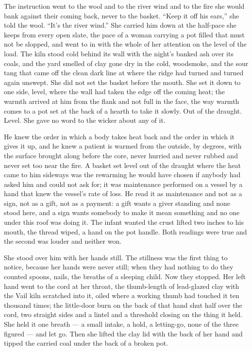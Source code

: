 The instruction went to the wool and to the river wind and to the fire she would bank against their coming back, never to the basket. “Keep it off his ears,” she told the wool. “It's the river wind.” She carried him down at the half-pace she keeps from every open slate, the pace of a woman carrying a pot filled that must not be slopped, and went to  in  with the whole of her attention on the level of the load. The kiln stood cold behind its wall with the night's banked ash over its coals, and the yard smelled of clay gone dry in the cold, woodsmoke, and the sour tang that came off the clean dark line at  where the ridge had turned and turned again unswept. She did not set the basket before the mouth. She set it down to one side, level, where the wall had taken the edge off the coming heat; the warmth arrived at him from the flank and not full in the face, the way warmth comes to a pot set at the back of a hearth to take it slowly. Out of the draught. Level. She gave no word to the wicker about any of it.

He knew the order in which a body takes heat back and the order in which it gives it up, and he knew a patient is warmed from the outside, by degrees, with the surface brought along before the core, never hurried and never rubbed and never set too near the fire. A basket set level out of the draught where the heat came to him sideways was the rewarming he would have chosen if anybody had asked him and could not ask for; it was maintenance performed on a vessel by a hand that knew the vessel's rate of loss. He read it as maintenance and not as a sign, not as a gift, not as a payment: a gift wants a giver standing and none stood here, and a sign wants somebody to make it mean something and no one under this roof was doing it. The infant wanted the crust lifted two inches to his mouth, the thread wiped, a hand on the pot handle. Both readings were true and the second was louder and neither won.

She stood over him with her hands still. The stillness was the first thing to notice, because her hands were never still; when they had nothing to do they counted spoons, nails, the breaths of a sleeping child. Now they stopped. Her left hand went to the cord at her throat, the thumb-length of lead-glazed clay with the Vail kiln scratched into it, oiled where a working thumb had touched it ten thousand times; the little-door burn on the back of that hand shut half over the cord, two straight sides and a lintel and a threshold closing on the thing it held. She held it one breath --- a small intake, a hold, a letting-go, none of the three figured --- and let go. Then she lifted the clay lid with the back of her hand and tipped the carried coal under the back of a broken pot.

